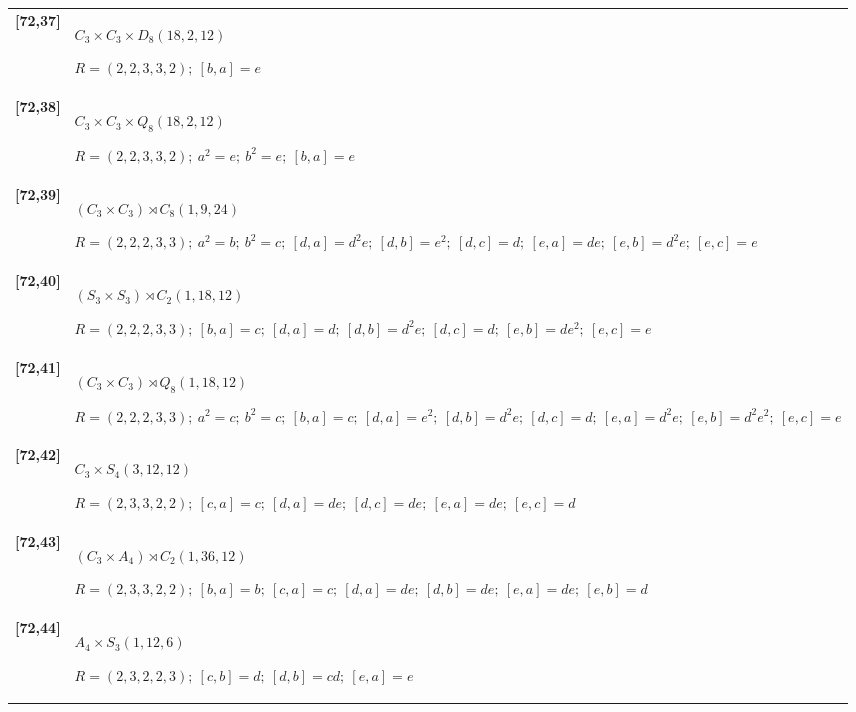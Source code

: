 \documentclass[UTF8,fontset=fandol,11pt,a4paper]{ctexart}
\begin{document}
\begin{longtable}{@{}p{17mm}>{\raggedright\arraybackslash}p{141mm}@{}}
\textbf{[72,37]} & $C_{3}\times C_{3}\times D_{8}$\quad $(18,2,12)$\par\(R=(2,2,3,3,2);\allowbreak\ [b,a]=e\)\\[3pt]

\textbf{[72,38]} & $C_{3}\times C_{3}\times Q_{8}$\quad $(18,2,12)$\par\(R=(2,2,3,3,2);\allowbreak\ a^{2}=e;\allowbreak\ b^{2}=e;\allowbreak\ [b,a]=e\)\\[3pt]

\textbf{[72,39]} & $(C_{3}\times C_{3})\rtimes C_{8}$\quad $(1,9,24)$\par\(R=(2,2,2,3,3);\allowbreak\ a^{2}=b;\allowbreak\ b^{2}=c;\allowbreak\ [d,a]=d^{2}e;\allowbreak\ [d,b]=e^{2};\allowbreak\ [d,c]=d;\allowbreak\ [e,a]=de;\allowbreak\ [e,b]=d^{2}e;\allowbreak\ [e,c]=e\)\\[3pt]

\textbf{[72,40]} & $(S_{3}\times S_{3})\rtimes C_{2}$\quad $(1,18,12)$\par\(R=(2,2,2,3,3);\allowbreak\ [b,a]=c;\allowbreak\ [d,a]=d;\allowbreak\ [d,b]=d^{2}e;\allowbreak\ [d,c]=d;\allowbreak\ [e,b]=de^{2};\allowbreak\ [e,c]=e\)\\[3pt]

\textbf{[72,41]} & $(C_{3}\times C_{3})\rtimes Q_{8}$\quad $(1,18,12)$\par\(R=(2,2,2,3,3);\allowbreak\ a^{2}=c;\allowbreak\ b^{2}=c;\allowbreak\ [b,a]=c;\allowbreak\ [d,a]=e^{2};\allowbreak\ [d,b]=d^{2}e;\allowbreak\ [d,c]=d;\allowbreak\ [e,a]=d^{2}e;\allowbreak\ [e,b]=d^{2}e^{2};\allowbreak\ [e,c]=e\)\\[3pt]

\textbf{[72,42]} & $C_{3}\times S_{4}$\quad $(3,12,12)$\par\(R=(2,3,3,2,2);\allowbreak\ [c,a]=c;\allowbreak\ [d,a]=de;\allowbreak\ [d,c]=de;\allowbreak\ [e,a]=de;\allowbreak\ [e,c]=d\)\\[3pt]

\textbf{[72,43]} & $(C_{3}\times A_{4})\rtimes C_{2}$\quad $(1,36,12)$\par\(R=(2,3,3,2,2);\allowbreak\ [b,a]=b;\allowbreak\ [c,a]=c;\allowbreak\ [d,a]=de;\allowbreak\ [d,b]=de;\allowbreak\ [e,a]=de;\allowbreak\ [e,b]=d\)\\[3pt]

\textbf{[72,44]} & $A_{4}\times S_{3}$\quad $(1,12,6)$\par\(R=(2,3,2,2,3);\allowbreak\ [c,b]=d;\allowbreak\ [d,b]=cd;\allowbreak\ [e,a]=e\)\\[3pt]


\end{longtable}
\end{document}
